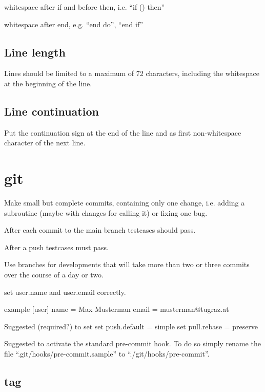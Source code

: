 \documentclass{article}
\begin{document}
whitespace after if and before then, i.e. ``if () then''

whitespace after end, e.g. ``end do'', ``end if''

\subsection{Line length}
Lines should be limited to a maximum of 72 characters, including the
whitespace at the beginning of the line.

\subsection{Line continuation}
Put the continuation sign at the end of the line and as first
non-whitespace character of the next line.

\section{git}

Make small but complete commits, containing only one change, i.e. adding
a subroutine (maybe with changes for calling it) or fixing one bug.

After each commit to the main branch testcases should pass.

After a push testcases must pass.

Use branches for developments that will take more than two or three
commits over the course of a day or two.

set user.name and user.email correctly.

example
[user]
  name = Max Musterman
  email = musterman@tugraz.at

Suggested (required?) to set
set push.default = simple
set pull.rebase = preserve

Suggested to activate the standard pre-commit hook. To do so simply
rename the file ``.git/hooks/pre-commit.sample'' to
``./git/hooks/pre-commit''.

\subsection{tag}
\end{document}
